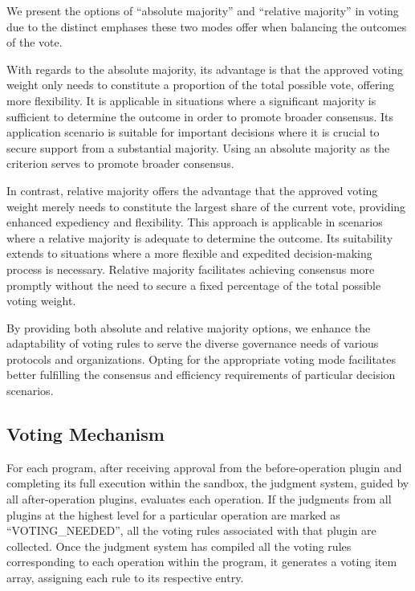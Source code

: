 \documentclass[main.tex]{subfiles}
\begin{document}
We present the options of ``absolute majority'' and ``relative majority'' in voting due to the distinct emphases these two modes offer when balancing the outcomes of the vote.

With regards to the absolute majority, its advantage is that the approved voting weight only needs to constitute a proportion of the total possible vote, offering more flexibility. It is applicable in situations where a significant majority is sufficient to determine the outcome in order to promote broader consensus. Its application scenario is suitable for important decisions where it is crucial to secure support from a substantial majority. Using an absolute majority as the criterion serves to promote broader consensus.

In contrast, relative majority offers the advantage that the approved voting weight merely needs to constitute the largest share of the current vote, providing enhanced expediency and flexibility. This approach is applicable in scenarios where a relative majority is adequate to determine the outcome. Its suitability extends to situations where a more flexible and expedited decision-making process is necessary. Relative majority facilitates achieving consensus more promptly without the need to secure a fixed percentage of the total possible voting weight.

By providing both absolute and relative majority options, we enhance the adaptability of voting rules to serve the diverse governance needs of various protocols and organizations. Opting for the appropriate voting mode facilitates better fulfilling the consensus and efficiency requirements of particular decision scenarios.

\subsection{Voting Mechanism}

For each program, after receiving approval from the before-operation plugin and completing its full execution within the sandbox, the judgment system, guided by all after-operation plugins, evaluates each operation. If the judgments from all plugins at the highest level for a particular operation are marked as ``VOTING\_NEEDED'', all the voting rules associated with that plugin are collected. Once the judgment system has compiled all the voting rules corresponding to each operation within the program, it generates a voting item array, assigning each rule to its respective entry.
\end{document}

